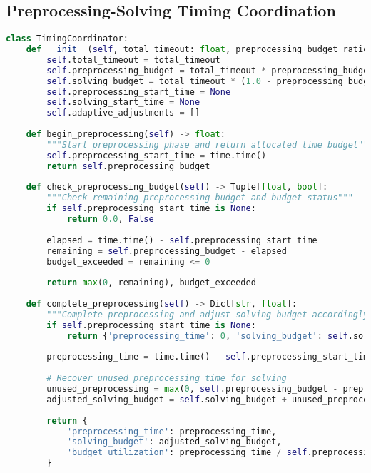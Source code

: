 \subsection{Preprocessing-Solving Timing Coordination}
\label{appendix:timing-coordination}

\begin{lstlisting}[language=Python, caption=Preprocessing-Solving Timing Coordination]
class TimingCoordinator:
    def __init__(self, total_timeout: float, preprocessing_budget_ratio: float = 0.15):
        self.total_timeout = total_timeout
        self.preprocessing_budget = total_timeout * preprocessing_budget_ratio
        self.solving_budget = total_timeout * (1.0 - preprocessing_budget_ratio)
        self.preprocessing_start_time = None
        self.solving_start_time = None
        self.adaptive_adjustments = []
    
    def begin_preprocessing(self) -> float:
        """Start preprocessing phase and return allocated time budget"""
        self.preprocessing_start_time = time.time()
        return self.preprocessing_budget
    
    def check_preprocessing_budget(self) -> Tuple[float, bool]:
        """Check remaining preprocessing budget and budget status"""
        if self.preprocessing_start_time is None:
            return 0.0, False
        
        elapsed = time.time() - self.preprocessing_start_time
        remaining = self.preprocessing_budget - elapsed
        budget_exceeded = remaining <= 0
        
        return max(0, remaining), budget_exceeded
    
    def complete_preprocessing(self) -> Dict[str, float]:
        """Complete preprocessing and adjust solving budget accordingly"""
        if self.preprocessing_start_time is None:
            return {'preprocessing_time': 0, 'solving_budget': self.solving_budget}
        
        preprocessing_time = time.time() - self.preprocessing_start_time
        
        # Recover unused preprocessing time for solving
        unused_preprocessing = max(0, self.preprocessing_budget - preprocessing_time)
        adjusted_solving_budget = self.solving_budget + unused_preprocessing
        
        return {
            'preprocessing_time': preprocessing_time,
            'solving_budget': adjusted_solving_budget,
            'budget_utilization': preprocessing_time / self.preprocessing_budget
        }
\end{lstlisting}

